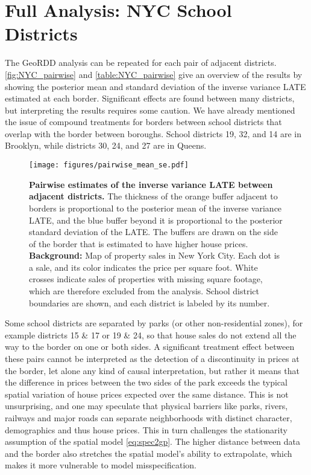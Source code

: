 \documentclass{article}
\newcommand{\autorefexternal}[1]{\autoref*{#1}}
\begin{document}
\section{Full Analysis: NYC School Districts}
\label{pairs-of-school-districts}

	The GeoRDD analysis can be repeated for each pair of adjacent districts.
\autoref{fig:NYC_pairwise} and \autoref{table:NYC_pairwise} give an overview of the results by showing the posterior mean and standard deviation of the inverse variance LATE estimated at each border.
Significant effects are found between many districts, but interpreting the results requires some caution.
We have already mentioned the issue of compound treatments for borders between school districts that overlap with the border between boroughs.
School districts 19, 32, and 14 are in Brooklyn, while districts 30, 24, and 27 are in Queens.


\begin{figure}[!tb]
    \centering
    \texttt{[image: figures/pairwise\_mean\_se.pdf]}
    \caption[]{
		\label{fig:NYC_pairwise}
        \textbf{Pairwise estimates of the inverse variance LATE between adjacent districts.}
        The thickness of the orange buffer adjacent to borders is proportional to the posterior mean of the inverse variance LATE, and the blue buffer beyond it is proportional to the posterior standard deviation of the LATE.
    The buffers are drawn on the side of the border that is estimated to have higher house prices. 
        \\\hspace{\textwidth}
        \textbf{Background:} 
        Map of property sales in New York City. Each dot is a sale, and its color indicates the price per square foot. White crosses indicate sales of properties with missing square footage, which are therefore excluded from the analysis. School district boundaries are shown, and each district is labeled by its number.
    }
\end{figure}

	Some school districts are separated by parks (or other non-residential zones), for example districts 15 \& 17 or 19 \& 24, so that house sales do not extend all the way to the border on one or both sides.
A significant treatment effect between these pairs cannot be interpreted as the detection of a discontinuity in prices at the border, let alone any kind of causal interpretation, but rather it means that the difference in prices between the two sides of the park exceeds the typical spatial variation of house prices expected over the same distance.
This is not unsurprising, and one may speculate that physical barriers like parks, rivers, railways and major roads can separate neighborhoods with distinct character, demographics and thus house prices.
This in turn challenges the stationarity assumption of the spatial model \autorefexternal{eq:spec2gp}.
The higher distance between data and the border also stretches the spatial model's ability to extrapolate, which makes it more vulnerable to model misspecification.
\end{document}
